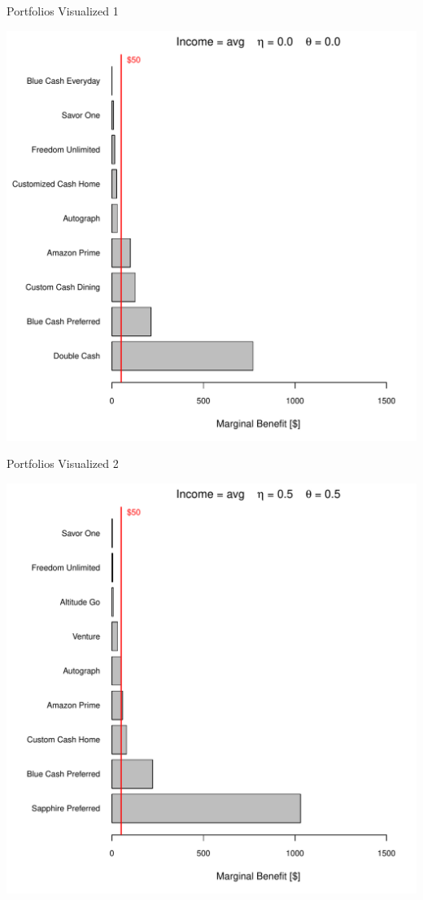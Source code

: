 \begin{frame}{Portfolios Visualized 1}
    \begin{center}
        \includegraphics[width=0.9\textheight]{../Figures/Portfolio_avg_9_0_0.pdf}
    \end{center}
\end{frame} 

\begin{frame}{Portfolios Visualized 2}
    \begin{center}
        \includegraphics[width=0.9\textheight]{../Figures/Portfolio_avg_9_05_05.pdf}
    \end{center}
\end{frame} 

